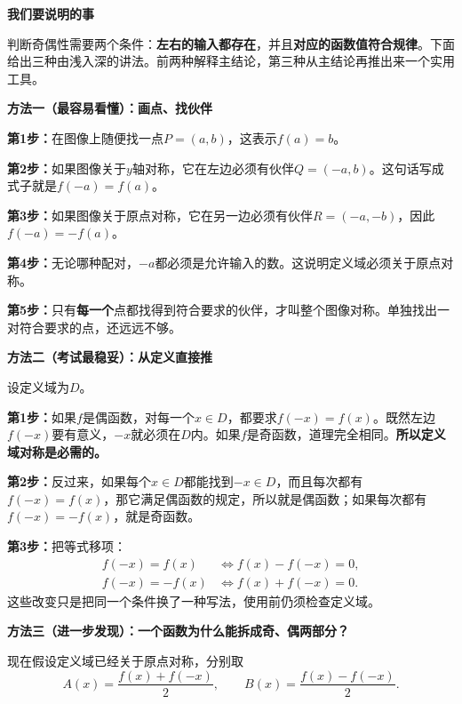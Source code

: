 \clearpage
\begin{proofbox}
\textbf{我们要说明的事}

判断奇偶性需要两个条件：\textbf{左右的输入都存在}，并且\textbf{对应的函数值符合规律}。下面给出三种由浅入深的讲法。前两种解释主结论，第三种从主结论再推出来一个实用工具。

\medskip
\textbf{方法一（最容易看懂）：画点、找伙伴}


\begin{center}

\end{center}




\textbf{第1步：}在图像上随便找一点$P=(a,b)$，这表示$f(a)=b$。

\textbf{第2步：}如果图像关于$y$轴对称，它在左边必须有伙伴$Q=(-a,b)$。这句话写成式子就是$f(-a)=f(a)$。

\textbf{第3步：}如果图像关于原点对称，它在另一边必须有伙伴$R=(-a,-b)$，因此$f(-a)=-f(a)$。

\textbf{第4步：}无论哪种配对，$-a$都必须是允许输入的数。这说明定义域必须关于原点对称。

\textbf{第5步：}只有\textbf{每一个}点都找得到符合要求的伙伴，才叫整个图像对称。单独找出一对符合要求的点，还远远不够。


\medskip
\end{proofbox}
\clearpage
\begin{proofbox}
\textbf{方法二（考试最稳妥）：从定义直接推}



设定义域为$D$。

\textbf{第1步：}如果$f$是偶函数，对每一个$x\in D$，都要求$f(-x)=f(x)$。既然左边$f(-x)$要有意义，$-x$就必须在$D$内。如果$f$是奇函数，道理完全相同。\textbf{所以定义域对称是必需的。}

\textbf{第2步：}反过来，如果每个$x\in D$都能找到$-x\in D$，而且每次都有$f(-x)=f(x)$，那它满足偶函数的规定，所以就是偶函数；如果每次都有$f(-x)=-f(x)$，就是奇函数。

\textbf{第3步：}把等式移项：
\[
\begin{aligned}
f(-x)=f(x)&\iff f(x)-f(-x)=0,\\
f(-x)=-f(x)&\iff f(x)+f(-x)=0.
\end{aligned}
\]
这些改变只是把同一个条件换了一种写法，使用前仍须检查定义域。

\medskip
\end{proofbox}
\clearpage
\begin{proofbox}
\textbf{方法三（进一步发现）：一个函数为什么能拆成奇、偶两部分？}



现在假设定义域已经关于原点对称，分别取
\[
A(x)=\frac{f(x)+f(-x)}2,\qquad B(x)=\frac{f(x)-f(-x)}2.
\]
\end{proofbox}
